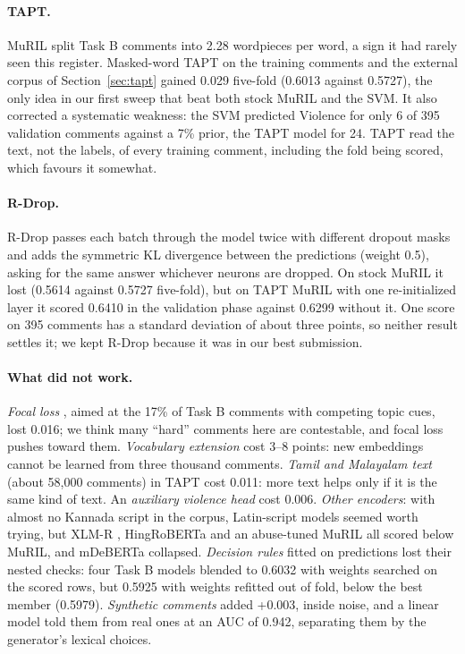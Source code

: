 \documentclass[11pt]{article}
\newcommand{\taskb}{Task B}
\begin{document}
\paragraph{TAPT.} MuRIL split \taskb{} comments into 2.28 wordpieces per word, a
sign it had rarely seen this register. Masked-word TAPT on the training comments
and the external corpus of Section~\ref{sec:tapt} gained 0.029 five-fold (0.6013
against 0.5727), the only idea in our first sweep that beat both stock MuRIL and
the SVM. It also corrected a systematic weakness: the SVM predicted Violence for only 6
of 395 validation comments against a 7\% prior, the TAPT model for 24. TAPT read the
text, not the labels, of every training comment, including the fold being
scored, which favours it somewhat.

\paragraph{R-Drop.} R-Drop \citep{liang-etal-2021-rdrop} passes each batch through
the model twice with different dropout masks and adds the symmetric KL
divergence between the predictions (weight 0.5), asking for the same answer
whichever neurons are dropped. On stock MuRIL it lost (0.5614 against 0.5727
five-fold), but on TAPT MuRIL with one re-initialized layer it scored 0.6410 in
the validation phase against 0.6299 without it. One score on 395 comments has a
standard deviation of about three points, so neither result settles it; we kept
R-Drop because it was in our best submission.

\paragraph{What did not work.} \emph{Focal loss} \citep{lin-etal-2017-focal},
aimed at the 17\% of \taskb{} comments with competing topic cues, lost 0.016; we
think many ``hard'' comments here are contestable, and focal loss pushes toward
them. \emph{Vocabulary extension} cost 3--8 points: new embeddings cannot be
learned from three thousand comments. \emph{Tamil and Malayalam text} (about
58,000 comments) in TAPT cost 0.011: more text helps only if it is the same kind
of text. An \emph{auxiliary violence head} cost 0.006. \emph{Other encoders}:
with almost no Kannada script in the corpus, Latin-script models seemed worth
trying, but XLM-R \citep{conneau-etal-2020-unsupervised}, HingRoBERTa
\citep{nayak-joshi-2022-l3cube} and an abuse-tuned MuRIL \citep{das-etal-2022-data}
all scored below MuRIL,
and mDeBERTa \citep{he-etal-2023-debertav3} collapsed. \emph{Decision rules}
fitted on predictions lost their nested checks: four \taskb{} models blended to
0.6032 with weights searched on the scored rows, but 0.5925 with weights refitted
out of fold, below the best member (0.5979). \emph{Synthetic comments} added
+0.003, inside noise, and a linear model told them from real ones at an AUC of
0.942, separating them by the generator's lexical choices.
\end{document}
